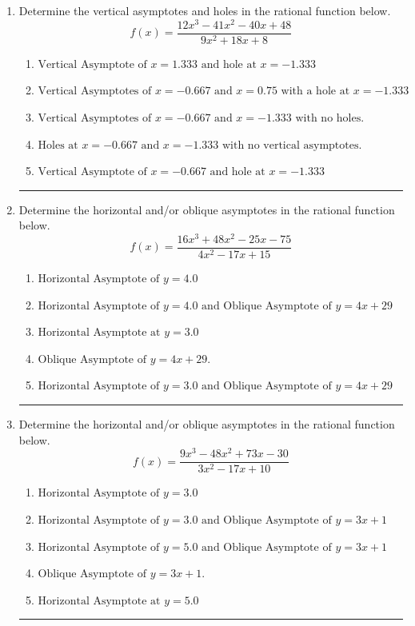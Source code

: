 \documentclass[14pt]{extbook}
\newcommand{\litem}[1]{\item#1\hspace*{-1cm}\rule{\textwidth}{0.4pt}}
\begin{document}
\begin{enumerate}
{\begin{enumerate}[label=\Alph*.]
\end{enumerate} }
\litem{
Determine the vertical asymptotes and holes in the rational function below.\[ f(x) = \frac{12x^{3} -41 x^{2} -40 x + 48}{9x^{2} +18 x + 8} \]\begin{enumerate}[label=\Alph*.]
\item \( \text{Vertical Asymptote of } x = 1.333 \text{ and hole at } x = -1.333 \)
\item \( \text{Vertical Asymptotes of } x = -0.667 \text{ and } x = 0.75 \text{ with a hole at } x = -1.333 \)
\item \( \text{Vertical Asymptotes of } x = -0.667 \text{ and } x = -1.333 \text{ with no holes.} \)
\item \( \text{Holes at } x = -0.667 \text{ and } x = -1.333 \text{ with no vertical asymptotes.} \)
\item \( \text{Vertical Asymptote of } x = -0.667 \text{ and hole at } x = -1.333 \)

\end{enumerate} }
\litem{
Determine the horizontal and/or oblique asymptotes in the rational function below.\[ f(x) = \frac{16x^{3} +48 x^{2} -25 x -75}{4x^{2} -17 x + 15} \]\begin{enumerate}[label=\Alph*.]
\item \( \text{Horizontal Asymptote of } y = 4.0  \)
\item \( \text{Horizontal Asymptote of } y = 4.0 \text{ and Oblique Asymptote of } y = 4x + 29 \)
\item \( \text{Horizontal Asymptote at } y = 3.0 \)
\item \( \text{Oblique Asymptote of } y = 4x + 29. \)
\item \( \text{Horizontal Asymptote of } y = 3.0 \text{ and Oblique Asymptote of } y = 4x + 29 \)

\end{enumerate} }
\litem{
Determine the horizontal and/or oblique asymptotes in the rational function below.\[ f(x) = \frac{9x^{3} -48 x^{2} +73 x -30}{3x^{2} -17 x + 10} \]\begin{enumerate}[label=\Alph*.]
\item \( \text{Horizontal Asymptote of } y = 3.0  \)
\item \( \text{Horizontal Asymptote of } y = 3.0 \text{ and Oblique Asymptote of } y = 3x + 1 \)
\item \( \text{Horizontal Asymptote of } y = 5.0 \text{ and Oblique Asymptote of } y = 3x + 1 \)
\item \( \text{Oblique Asymptote of } y = 3x + 1. \)
\item \( \text{Horizontal Asymptote at } y = 5.0 \)


\end{enumerate}}
\end{enumerate}
\end{document}
